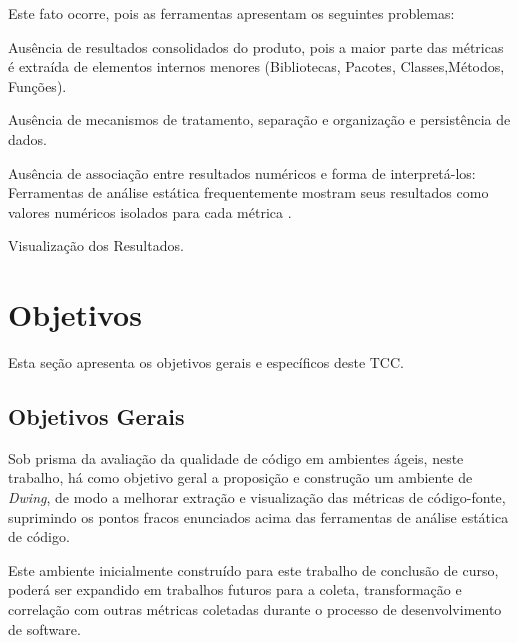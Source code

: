 Este fato ocorre, pois as ferramentas apresentam os seguintes problemas:


\begin{myList}
    \item Ausência de resultados consolidados do produto, pois a maior 
	parte das métricas é extraída de elementos internos menores (Bibliotecas, 
	Pacotes, Classes,Métodos, Funções).
    
	\item  Ausência de mecanismos de tratamento, separação e 
	organização e 
	persistência de dados. 
	
	\item Ausência de associação entre resultados numéricos e forma de 
	interpretá-los: Ferramentas de análise estática frequentemente mostram 
	seus resultados como valores numéricos isolados para cada métrica 
	\cite{Meirelles2013}.
	
	\item Visualização dos Resultados.
	
    \end{myList}
	
	







\section{Objetivos}

Esta seção apresenta os objetivos gerais e específicos deste TCC.

\subsection{Objetivos Gerais}
Sob prisma da avaliação da qualidade de código em ambientes ágeis, 
neste trabalho, há como objetivo geral a proposição e construção um ambiente de 
\textit{Dwing}, de modo a melhorar extração e visualização das métricas de 
código-fonte, suprimindo os pontos fracos enunciados acima das ferramentas de 
análise estática de código.

Este ambiente inicialmente construído para este trabalho de conclusão de curso, 
poderá ser expandido em trabalhos futuros para a coleta, transformação e 
correlação com outras métricas coletadas durante o processo de desenvolvimento 
de software. 


